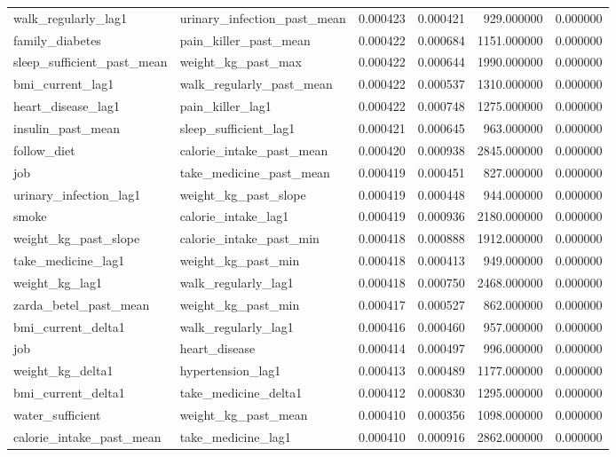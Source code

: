 \begin{longtable}{llrrrr}
walk\_regularly\_lag1 & urinary\_infection\_past\_mean & 0.000423 & 0.000421 & 929.000000 & 0.000000 \\
family\_diabetes & pain\_killer\_past\_mean & 0.000422 & 0.000684 & 1151.000000 & 0.000000 \\
sleep\_sufficient\_past\_mean & weight\_kg\_past\_max & 0.000422 & 0.000644 & 1990.000000 & 0.000000 \\
bmi\_current\_lag1 & walk\_regularly\_past\_mean & 0.000422 & 0.000537 & 1310.000000 & 0.000000 \\
heart\_disease\_lag1 & pain\_killer\_lag1 & 0.000422 & 0.000748 & 1275.000000 & 0.000000 \\
insulin\_past\_mean & sleep\_sufficient\_lag1 & 0.000421 & 0.000645 & 963.000000 & 0.000000 \\
follow\_diet & calorie\_intake\_past\_mean & 0.000420 & 0.000938 & 2845.000000 & 0.000000 \\
job & take\_medicine\_past\_mean & 0.000419 & 0.000451 & 827.000000 & 0.000000 \\
urinary\_infection\_lag1 & weight\_kg\_past\_slope & 0.000419 & 0.000448 & 944.000000 & 0.000000 \\
smoke & calorie\_intake\_lag1 & 0.000419 & 0.000936 & 2180.000000 & 0.000000 \\
weight\_kg\_past\_slope & calorie\_intake\_past\_min & 0.000418 & 0.000888 & 1912.000000 & 0.000000 \\
take\_medicine\_lag1 & weight\_kg\_past\_min & 0.000418 & 0.000413 & 949.000000 & 0.000000 \\
weight\_kg\_lag1 & walk\_regularly\_lag1 & 0.000418 & 0.000750 & 2468.000000 & 0.000000 \\
zarda\_betel\_past\_mean & weight\_kg\_past\_min & 0.000417 & 0.000527 & 862.000000 & 0.000000 \\
bmi\_current\_delta1 & walk\_regularly\_lag1 & 0.000416 & 0.000460 & 957.000000 & 0.000000 \\
job & heart\_disease & 0.000414 & 0.000497 & 996.000000 & 0.000000 \\
weight\_kg\_delta1 & hypertension\_lag1 & 0.000413 & 0.000489 & 1177.000000 & 0.000000 \\
bmi\_current\_delta1 & take\_medicine\_delta1 & 0.000412 & 0.000830 & 1295.000000 & 0.000000 \\
water\_sufficient & weight\_kg\_past\_mean & 0.000410 & 0.000356 & 1098.000000 & 0.000000 \\
calorie\_intake\_past\_mean & take\_medicine\_lag1 & 0.000410 & 0.000916 & 2862.000000 & 0.000000 \\

\end{longtable}

